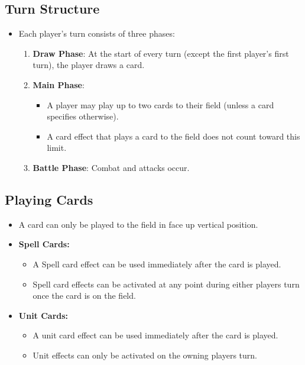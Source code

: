 \subsection{Turn Structure}
\begin{itemize}
\item Each player's turn consists of three phases:
	\begin{enumerate}
	    \item \textbf{Draw Phase}: At the start of every turn (except the first player's first turn), the player draws a card.
	    \item \textbf{Main Phase}:
	    \begin{itemize}
	        \item A player may play up to two cards to their field (unless a card specifies otherwise).
	        \item A card effect that plays a card to the field does not count toward this limit.
	    \end{itemize}
	    \item \textbf{Battle Phase}: Combat and attacks occur.
	\end{enumerate}
\end{itemize}








\subsection{Playing Cards}
\begin{itemize}
    \item A card can only be played to the field in face up vertical position.
    \item \textbf{Spell Cards:}
    \begin{itemize}
        \item A Spell card effect can be used immediately after the card is played.
        \item Spell card effects can be activated at any point during either players turn once the card is on the field.
    \end{itemize}
    \item \textbf{Unit Cards:}
    \begin{itemize}
        \item A unit card effect can be used immediately after the card is played.
        \item Unit effects can only be activated on the owning players turn.
    \end{itemize}
\end{itemize}






